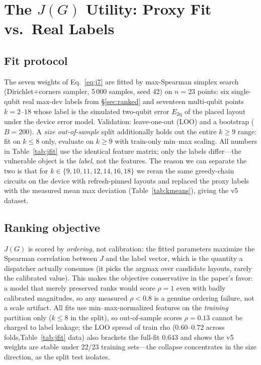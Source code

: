 \documentclass[journal,10pt,twocolumn]{IEEEtran}
\begin{document}
\section{The $J(G)$ Utility: Proxy Fit vs.\ Real Labels}
\label{sec:jreal}

\subsection{Fit protocol}
The seven weights of Eq.~\eqref{eq:j7} are fitted by max-Spearman simplex search (Dirichlet$+$corners sampler,
5\,000 samples, seed 42) on $n{=}23$ points: six single-qubit real max-dev labels from \S\ref{sec:ranked} and
seventeen multi-qubit points $k{=}2$--$18$ whose label is the simulated two-qubit error
$E_{\mathrm{2q}}$ of the placed layout under the device error model. Validation: leave-one-out (LOO) and a
bootstrap ($B{=}200$). A \emph{size out-of-sample} split additionally holds out the entire $k{\ge}9$ range: fit on
$k{\le}8$ only, evaluate on $k{\ge}9$ with train-only min--max scaling. All numbers in Table~\ref{tab:jfit} use the
identical feature matrix; only the labels differ---the vulnerable object is the \emph{label}, not the features.
The reason we can separate the two is that for $k\in\{9,10,11,12,14,16,18\}$ we reran the same greedy-chain
circuits on the device with refresh-pinned layouts and replaced the proxy labels with the measured mean max
deviation (Table~\ref{tab:kmeans}), giving the v5 dataset.

\subsection{Ranking objective}
$J(G)$ is scored by \emph{ordering}, not calibration: the fitted parameters maximize the Spearman correlation
between $J$ and the label vector, which is the quantity a dispatcher actually consumes (it picks the argmax over
candidate layouts, rarely the calibrated value). This makes the objective conservative in the paper's favor: a
model that merely preserved ranks would score $\rho{=}1$ even with badly calibrated magnitudes, so any measured
$\rho<0.8$ is a genuine ordering failure, not a scale artifact. All fits use min--max-normalized features on the
\emph{training} partition only ($k\le8$ in the split), so out-of-sample scores $\rho{=}0.13$ cannot be charged to
label leakage; the LOO spread of train rho ($0.60$--$0.72$ across folds,Table~\ref{tab:jfit} data) also brackets
the full-fit $0.643$ and shows the v5 weights are stable under 22/23 training sets---the collapse concentrates in
the size direction, as the split test isolates.
\end{document}
